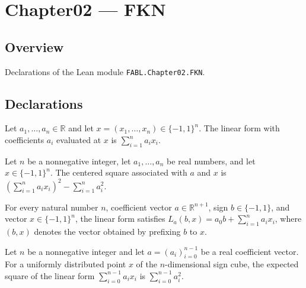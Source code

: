 \chapter{Chapter02 — FKN}
\section{Overview}

Declarations of the Lean module \texttt{FABL.Chapter02.FKN}.

\section{Declarations}

\begin{definition}
\label{FABL.linearForm}
\leanok
{}
Let $a_1,\ldots,a_n\in\mathbb{R}$ and let $x=(x_1,\ldots,x_n)\in\{-1,1\}^n$. The linear
form with coefficients $a_i$ evaluated at $x$ is $\sum_{i=1}^n a_i x_i$.
\end{definition}

\begin{definition}
\label{FABL.centeredLinearSquare}
\leanok
{}
Let $n$ be a nonnegative integer, let $a_1,\dots,a_n$ be real numbers, and let
$x\in\{-1,1\}^n$. The centered square associated with $a$ and $x$ is
$(\sum_{i=1}^n a_i x_i)^2-\sum_{i=1}^n a_i^2$.
\end{definition}

\begin{theorem}
\label{FABL.linearForm_fin_cons}
\leanok
{}
For every natural number $n$, coefficient vector $a\in\mathbb{R}^{n+1}$, sign
$b\in\{-1,1\}$, and vector $x\in\{-1,1\}^n$, the linear form satisfies
$L_a(b,x)=a_0b+\sum_{i=1}^n a_i x_i$, where $(b,x)$ denotes the vector obtained by
prefixing $b$ to $x$.
\end{theorem}

\begin{theorem}
\label{FABL.expect_linearForm_sq}
\leanok
{}
Let $n$ be a nonnegative integer and let $a=(a_i)_{i=0}^{n-1}$ be a real coefficient
vector. For a uniformly distributed point $x$ of the $n$-dimensional sign cube, the
expected square of the linear form $\sum_{i=0}^{n-1} a_i x_i$ is $\sum_{i=0}^{n-1}
a_i^2$.
\end{theorem}

